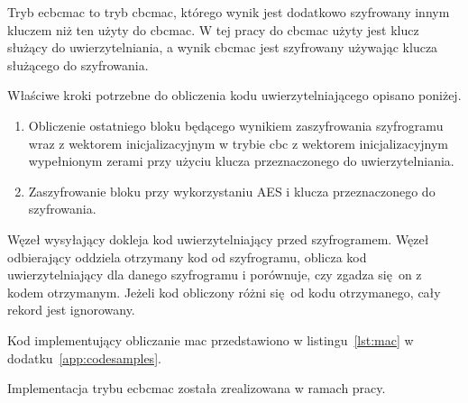 Tryb \gls{ecbcmac} to tryb \gls{cbcmac}, którego wynik jest dodatkowo szyfrowany innym kluczem niż ten użyty do \gls{cbcmac}. W tej pracy do \gls{cbcmac} użyty jest klucz służący do uwierzytelniania, a wynik \gls{cbcmac} jest szyfrowany używając klucza służącego do szyfrowania.

Właściwe kroki potrzebne do obliczenia kodu uwierzytelniającego opisano poniżej.

\begin{enumerate}
\item Obliczenie ostatniego bloku będącego wynikiem zaszyfrowania szyfrogramu wraz z wektorem inicjalizacyjnym w trybie \gls{cbc} z wektorem inicjalizacyjnym wypełnionym zerami przy użyciu klucza przeznaczonego do uwierzytelniania.
\item Zaszyfrowanie bloku przy wykorzystaniu AES i klucza przeznaczonego do szyfrowania.
\end{enumerate}

Węzeł wysyłający dokleja kod uwierzytelniający przed szyfrogramem. Węzeł odbierający oddziela otrzymany kod od szyfrogramu, oblicza kod uwierzytelniający dla danego szyfrogramu i porównuje, czy zgadza się on z kodem otrzymanym. Jeżeli kod obliczony różni się od kodu otrzymanego, cały rekord jest ignorowany.

Kod implementujący obliczanie \gls{mac} przedstawiono w listingu~\ref{lst:mac} w dodatku~\ref{app:codesamples}.

Implementacja trybu \gls{ecbcmac} została zrealizowana w ramach pracy.
